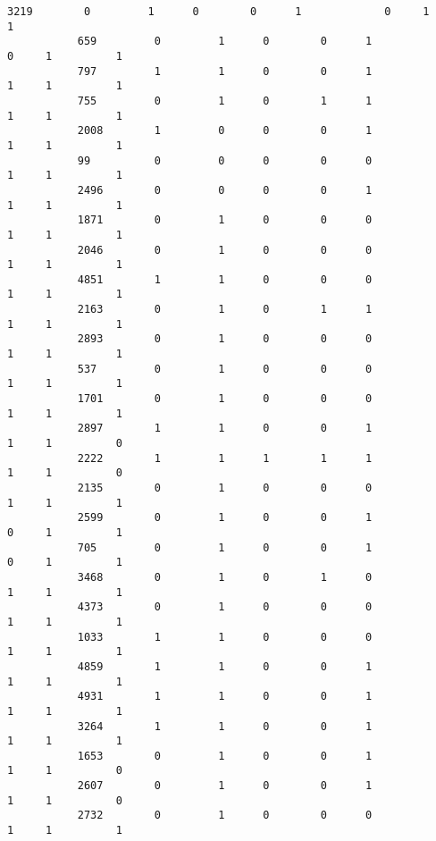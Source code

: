 \documentclass[11pt]{article}
\begin{document}
\begin{Verbatim}[commandchars=\\\{\}]
           3219        0         1      0        0      1             0     1          1   
           659         0         1      0        0      1             0     1          1   
           797         1         1      0        0      1             1     1          1   
           755         0         1      0        1      1             1     1          1   
           2008        1         0      0        0      1             1     1          1   
           99          0         0      0        0      0             1     1          1   
           2496        0         0      0        0      1             1     1          1   
           1871        0         1      0        0      0             1     1          1   
           2046        0         1      0        0      0             1     1          1   
           4851        1         1      0        0      0             1     1          1   
           2163        0         1      0        1      1             1     1          1   
           2893        0         1      0        0      0             1     1          1   
           537         0         1      0        0      0             1     1          1   
           1701        0         1      0        0      0             1     1          1   
           2897        1         1      0        0      1             1     1          0   
           2222        1         1      1        1      1             1     1          0   
           2135        0         1      0        0      0             1     1          1   
           2599        0         1      0        0      1             0     1          1   
           705         0         1      0        0      1             0     1          1   
           3468        0         1      0        1      0             1     1          1   
           4373        0         1      0        0      0             1     1          1   
           1033        1         1      0        0      0             1     1          1   
           4859        1         1      0        0      1             1     1          1   
           4931        1         1      0        0      1             1     1          1   
           3264        1         1      0        0      1             1     1          1   
           1653        0         1      0        0      1             1     1          0   
           2607        0         1      0        0      1             1     1          0   
           2732        0         1      0        0      0             1     1          1   
           

\end{Verbatim}
\end{document}
